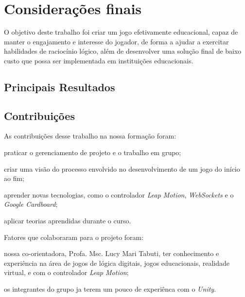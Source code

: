 
\chapter{Considerações finais}\label{cap-consideracoes-finais}

O objetivo deste trabalho foi criar um jogo efetivamente educacional, capaz de manter o engajamento e interesse do jogador, de forma a ajudar a exercitar habilidades de raciocínio lógico, além de desenvolver uma solução final de baixo custo que possa ser implementada em instituições educacionais.

\section{Principais Resultados}\label{sec-conc-resultados}


\section{Contribuições}\label{sec-conc-contribuicoes}

As contribuições desse trabalho na nossa formação foram:

\begin{alineas}
	\item praticar o gerenciamento de projeto e o trabalho em grupo;
	\item criar uma visão do processo envolvido no desenvolvimento de um jogo do início ao fim;
	\item aprender novas tecnologias, como o controlador \textit{Leap Motion}, \textit{WebSockets} e o \textit{Google Cardboard};
	\item aplicar teorias aprendidas durante o curso.
\end{alineas}

Fatores que colaboraram para o projeto foram:

\begin{alineas}
	\item nossa co-orientadora, Profa. Msc. Lucy Mari Tabuti, ter conhecimento e experiência na área de jogos de lógica digitais, jogos educacionais, realidade virtual, e com o controlador \textit{Leap Motion};
	\item os integrantes do grupo ja terem um pouco de experiênca com o \textit{Unity}.
\end{alineas}

